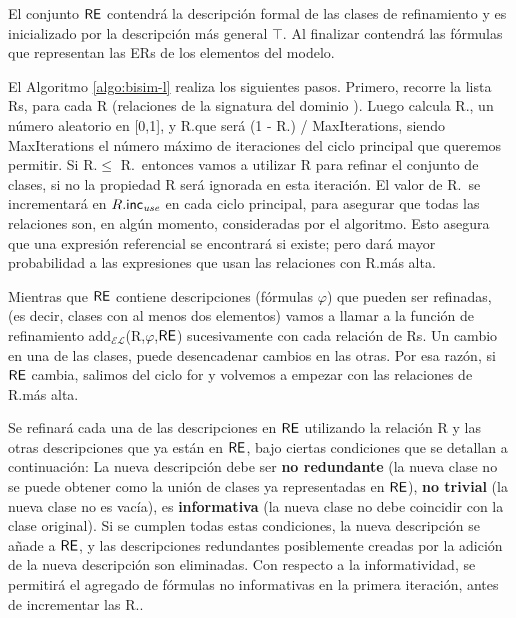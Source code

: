 El conjunto $\textsf{RE}$ contendr\'a la descripci\'on formal de las clases de refinamiento
y es inicializado por la descripci\'on m\'as general $\top$. Al finalizar contendr\'a las f\'ormulas que representan las ERs de los elementos del modelo.

El Algoritmo \ref{algo:bisim-l} realiza los siguientes pasos. Primero, recorre la lista Rs, para cada R (relaciones de la signatura del dominio \REL). Luego calcula R.\randomuse, un n\'umero aleatorio en [0,1], y R.\incuse que ser\'a (1 - R.\puse) / MaxIterations, siendo MaxIterations el n\'umero m\'aximo de iteraciones del ciclo principal que queremos permitir. Si R.\randomuse $\le$ R.\puse\ entonces vamos a utilizar R para refinar el conjunto de
clases, si no la propiedad R ser\'a ignorada en esta iteraci\'on. El valor de R.\puse\ se incrementar\'a en $R.\textsf{inc}_\emph{use}$
en cada ciclo principal, para asegurar que todas las relaciones son, en alg\'un momento,
consideradas por el algoritmo. Esto asegura que una expresi\'on referencial
se encontrar\'a si existe; pero dar\'a mayor probabilidad a las expresiones
que usan las relaciones con R.\puse m\'as alta. 

Mientras que $\textsf{RE}$ contiene descripciones (f\'ormulas $\varphi$) que pueden ser refinadas, (es decir, clases
con al menos dos elementos) vamos a llamar a la funci\'on de refinamiento
add$_\mathcal{EL}$(R,$\varphi$,$\textsf{RE}$) sucesivamente con cada relaci\'on
de Rs. Un cambio en una de las clases, puede desencadenar cambios en
las otras. Por esa raz\'on, si $\textsf{RE}$ cambia, salimos del ciclo for y volvemos a
empezar con las relaciones de R.\puse m\'as alta. 

Se refinar\'a cada una de las descripciones
en $\textsf{RE}$ utilizando la relaci\'on R y las otras descripciones que ya est\'an en
$\textsf{RE}$, bajo ciertas condiciones que se detallan a continuaci\'on: 
La nueva descripci\'on debe ser
\textbf{no redundante} (la nueva clase no se puede obtener como la uni\'on de
clases ya representadas en $\textsf{RE}$), \textbf{no trivial} (la nueva
clase no es vac\'{i}a), es \textbf{informativa} (la nueva clase no debe
coincidir con la clase original). Si se cumplen todas estas condiciones,
la nueva descripci\'on se a\~nade a $\textsf{RE}$, y las descripciones redundantes
posiblemente creadas por la adici\'on de la nueva descripci\'on son
eliminadas.
Con respecto a la informatividad, se permitir\'a el agregado de f\'ormulas no informativas en la primera iteraci\'on, antes de incrementar las R.\puse.


